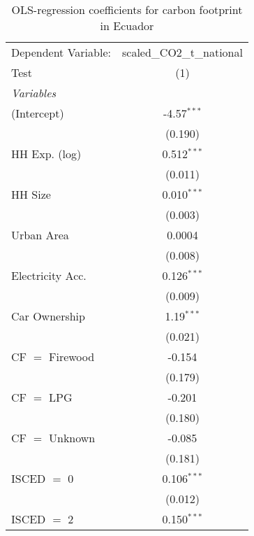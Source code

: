 
\begin{table}[htbp!]
   \centering
   \small
   \begin{adjustbox}{width = 1\textwidth, max height = 0.95\textheight, center}
      \begin{threeparttable}[b]
         \caption{\label{tab:OLS_2_ECU} OLS-regression coefficients for carbon footprint in Ecuador}
         \begin{tabular}{lc}
            \tabularnewline \midrule \midrule
            Dependent Variable: & scaled\_CO2\_t\_national\\     
            Test                & (1)\\  
            \midrule
            \emph{Variables}\\
            (Intercept)         & -4.57$^{***}$\\   
                                & (0.190)\\   
            HH Exp. (log)       & 0.512$^{***}$\\   
                                & (0.011)\\   
            HH Size             & 0.010$^{***}$\\   
                                & (0.003)\\   
            Urban Area          & 0.0004\\   
                                & (0.008)\\   
            Electricity Acc.    & 0.126$^{***}$\\   
                                & (0.009)\\   
            Car Ownership       & 1.19$^{***}$\\   
                                & (0.021)\\   
            CF $=$ Firewood     & -0.154\\   
                                & (0.179)\\   
            CF $=$ LPG          & -0.201\\   
                                & (0.180)\\   
            CF $=$ Unknown      & -0.085\\   
                                & (0.181)\\   
            ISCED $=$ 0         & 0.106$^{***}$\\   
                                & (0.012)\\   
            ISCED $=$ 2         & 0.150$^{***}$\\   

\end{tabular}
\end{threeparttable}
\end{adjustbox}
\end{table}
